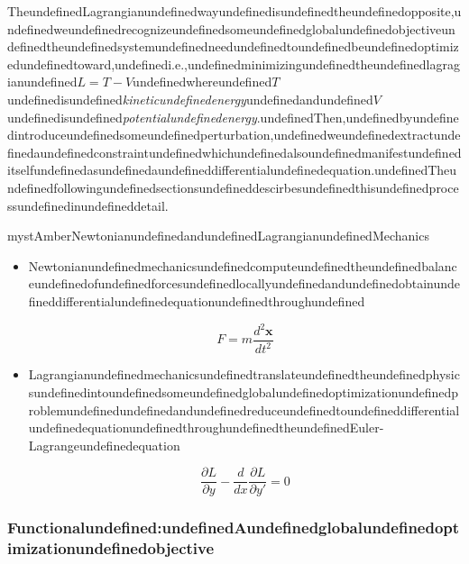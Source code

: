 TheundefinedLagrangianundefinedwayundefinedisundefinedtheundefinedopposite,undefinedweundefinedrecognizeundefinedsomeundefinedglobalundefinedobjectiveundefinedtheundefinedsystemundefinedneedundefinedtoundefinedbeundefinedoptimizedundefinedtoward,undefinedi.e.,undefinedminimizingundefinedtheundefinedlagragianundefined$L=T -V$undefinedwhereundefined$T$undefinedisundefined\textit{kineticundefinedenergy}undefinedandundefined$V$undefinedisundefined\textit{potentialundefinedenergy}.undefinedThen,undefinedbyundefinedintroduceundefinedsomeundefinedperturbation,undefinedweundefinedextractundefinedaundefinedconstraintundefinedwhichundefinedalsoundefinedmanifestundefineditselfundefinedasundefinedaundefineddifferentialundefinedequation.undefinedTheundefinedfollowingundefinedsectionsundefineddescirbesundefinedthisundefinedprocessundefinedinundefineddetail.

\begin{mystadmonition}{mystAmber}{NewtonianundefinedandundefinedLagrangianundefinedMechanics}\begin{itemize}
\item Newtonianundefinedmechanicsundefinedcomputeundefinedtheundefinedbalanceundefinedofundefinedforcesundefinedlocallyundefinedandundefinedobtainundefineddifferentialundefinedequationundefinedthroughundefined

\begin{equation}
F=m\frac{d^2\mathbf{x}}{dt^2}
\end{equation}


\item LagrangianundefinedmechanicsundefinedtranslateundefinedtheundefinedphysicsundefinedintoundefinedsomeundefinedglobalundefinedoptimizationundefinedproblemundefinedundefinedandundefinedreduceundefinedtoundefineddifferentialundefinedequationundefinedthroughundefinedtheundefinedEuler-Lagrangeundefinedequation

\begin{equation}
\frac{\partial L}{\partial y}- \frac{d}{dx}\frac{\partial L}{\partial y'}=0
\end{equation}
\end{itemize}

\end{mystadmonition}
\subsubsection{Functionalundefined:undefinedAundefinedglobalundefinedoptimizationundefinedobjective}

